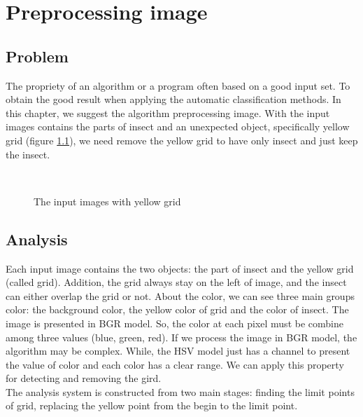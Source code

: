\chapter{Preprocessing image}
\section{Problem}
The propriety of an algorithm or a program often based on a good input set. To obtain the good result when applying the automatic classification methods. In this chapter, we suggest the algorithm preprocessing image. With the input images contains the parts of insect and an unexpected object, specifically yellow grid (figure \ref{fig:figure_31}), we need remove the yellow grid to have only insect and just keep the insect.
\begin{figure}[h!]
\centering
{}~~
\caption{The input images with yellow grid}
\label{fig:figure_31}
\end{figure}
\section{Analysis}
Each input image contains the two objects: the part of insect and the yellow grid (called grid). Addition, the grid always stay on the left of image, and the insect can either overlap the grid or not. About the color, we can see three main groups color: the background color, the yellow color of grid and the color of insect. The image is presented in BGR model. So, the color at each pixel must be combine among three values (blue, green, red). If we process the image in BGR model, the algorithm may be complex. While, the HSV model just has a channel to present the value of color and each color has a clear range. We can apply this property for detecting and removing the gird.\\
The analysis system is constructed from two main stages: finding the limit points of grid, replacing the yellow point from the begin to the limit point.
